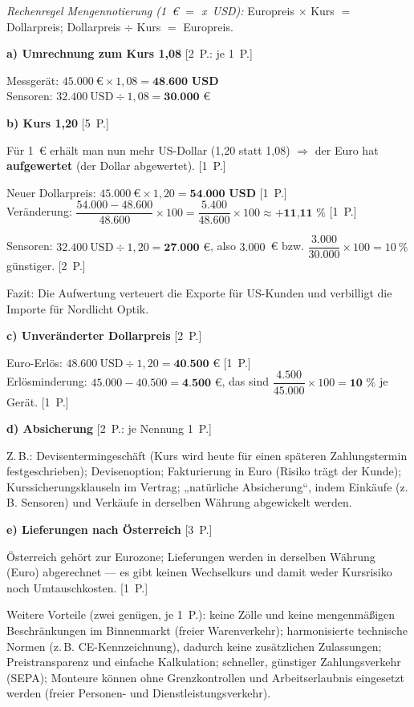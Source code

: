 \begin{loesung}[title={Lösung Aufgabe~3.3 --- Wechselkursänderung im Exportgeschäft}]
\emph{Rechenregel Mengennotierung (1~€ $=$ x~USD):} Europreis $\times$ Kurs $=$
Dollarpreis; Dollarpreis $\div$ Kurs $=$ Europreis.

\medskip
\textbf{a) Umrechnung zum Kurs 1,08} \hfill [2~P.: je 1~P.]

Messgerät: $45.000~\text{€} \times 1{,}08 = \textbf{48.600~USD}$\\
Sensoren: $32.400~\text{USD} \div 1{,}08 = \textbf{30.000~€}$

\medskip
\textbf{b) Kurs 1,20} \hfill [5~P.]

Für 1~€ erhält man nun mehr US-Dollar (1,20 statt 1,08) $\Rightarrow$ der Euro hat
\textbf{aufgewertet} (der Dollar abgewertet). [1~P.]

Neuer Dollarpreis: $45.000~\text{€} \times 1{,}20 = \textbf{54.000~USD}$ [1~P.]\\
Veränderung: $\dfrac{54.000 - 48.600}{48.600} \times 100 = \dfrac{5.400}{48.600} \times 100
\approx \textbf{+11,11~\%}$ [1~P.]

Sensoren: $32.400~\text{USD} \div 1{,}20 = \textbf{27.000~€}$, also
$3.000$~€ bzw. $\dfrac{3.000}{30.000} \times 100 = 10~\%$ günstiger. [2~P.]

Fazit: Die Aufwertung verteuert die Exporte für US-Kunden und verbilligt die Importe
für Nordlicht Optik.

\medskip
\textbf{c) Unveränderter Dollarpreis} \hfill [2~P.]

Euro-Erlös: $48.600~\text{USD} \div 1{,}20 = \textbf{40.500~€}$ [1~P.]\\
Erlösminderung: $45.000 - 40.500 = \textbf{4.500~€}$, das sind
$\dfrac{4.500}{45.000} \times 100 = \textbf{10~\%}$ je Gerät. [1~P.]

\medskip
\textbf{d) Absicherung} \hfill [2~P.: je Nennung 1~P.]

Z.\,B.: Devisentermingeschäft (Kurs wird heute für einen späteren Zahlungstermin
festgeschrieben); Devisenoption; Fakturierung in Euro (Risiko trägt der Kunde);
Kurssicherungsklauseln im Vertrag; „natürliche Absicherung“, indem Einkäufe (z.\,B.
Sensoren) und Verkäufe in derselben Währung abgewickelt werden.

\medskip
\textbf{e) Lieferungen nach Österreich} \hfill [3~P.]

Österreich gehört zur Eurozone; Lieferungen werden in derselben Währung (Euro) abgerechnet
--- es gibt keinen Wechselkurs und damit weder Kursrisiko noch Umtauschkosten. [1~P.]

Weitere Vorteile (zwei genügen, je 1~P.): keine Zölle und keine mengenmäßigen
Beschränkungen im Binnenmarkt (freier Warenverkehr); harmonisierte technische Normen
(z.\,B. CE-Kennzeichnung), dadurch keine zusätzlichen Zulassungen; Preistransparenz und
einfache Kalkulation; schneller, günstiger Zahlungsverkehr (SEPA); Monteure können
ohne Grenzkontrollen und Arbeitserlaubnis eingesetzt werden (freier Personen- und
Dienstleistungsverkehr).
\end{loesung}

